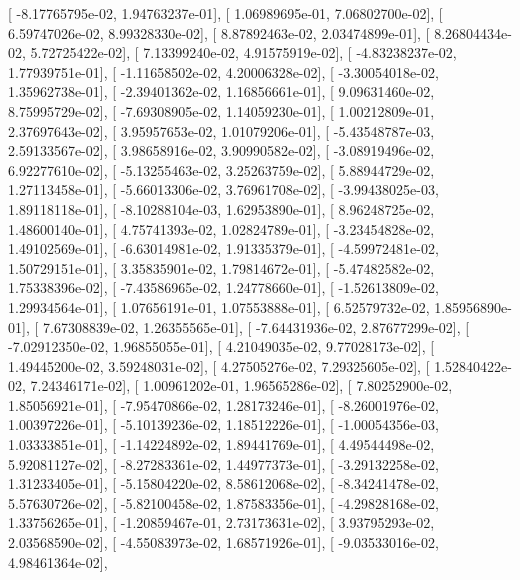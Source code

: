 \documentclass{article}
\begin{document}
       [ -8.17765795e-02,   1.94763237e-01],
       [  1.06989695e-01,   7.06802700e-02],
       [  6.59747026e-02,   8.99328330e-02],
       [  8.87892463e-02,   2.03474899e-01],
       [  8.26804434e-02,   5.72725422e-02],
       [  7.13399240e-02,   4.91575919e-02],
       [ -4.83238237e-02,   1.77939751e-01],
       [ -1.11658502e-02,   4.20006328e-02],
       [ -3.30054018e-02,   1.35962738e-01],
       [ -2.39401362e-02,   1.16856661e-01],
       [  9.09631460e-02,   8.75995729e-02],
       [ -7.69308905e-02,   1.14059230e-01],
       [  1.00212809e-01,   2.37697643e-02],
       [  3.95957653e-02,   1.01079206e-01],
       [ -5.43548787e-03,   2.59133567e-02],
       [  3.98658916e-02,   3.90990582e-02],
       [ -3.08919496e-02,   6.92277610e-02],
       [ -5.13255463e-02,   3.25263759e-02],
       [  5.88944729e-02,   1.27113458e-01],
       [ -5.66013306e-02,   3.76961708e-02],
       [ -3.99438025e-03,   1.89118118e-01],
       [ -8.10288104e-03,   1.62953890e-01],
       [  8.96248725e-02,   1.48600140e-01],
       [  4.75741393e-02,   1.02824789e-01],
       [ -3.23454828e-02,   1.49102569e-01],
       [ -6.63014981e-02,   1.91335379e-01],
       [ -4.59972481e-02,   1.50729151e-01],
       [  3.35835901e-02,   1.79814672e-01],
       [ -5.47482582e-02,   1.75338396e-02],
       [ -7.43586965e-02,   1.24778660e-01],
       [ -1.52613809e-02,   1.29934564e-01],
       [  1.07656191e-01,   1.07553888e-01],
       [  6.52579732e-02,   1.85956890e-01],
       [  7.67308839e-02,   1.26355565e-01],
       [ -7.64431936e-02,   2.87677299e-02],
       [ -7.02912350e-02,   1.96855055e-01],
       [  4.21049035e-02,   9.77028173e-02],
       [  1.49445200e-02,   3.59248031e-02],
       [  4.27505276e-02,   7.29325605e-02],
       [  1.52840422e-02,   7.24346171e-02],
       [  1.00961202e-01,   1.96565286e-02],
       [  7.80252900e-02,   1.85056921e-01],
       [ -7.95470866e-02,   1.28173246e-01],
       [ -8.26001976e-02,   1.00397226e-01],
       [ -5.10139236e-02,   1.18512226e-01],
       [ -1.00054356e-03,   1.03333851e-01],
       [ -1.14224892e-02,   1.89441769e-01],
       [  4.49544498e-02,   5.92081127e-02],
       [ -8.27283361e-02,   1.44977373e-01],
       [ -3.29132258e-02,   1.31233405e-01],
       [ -5.15804220e-02,   8.58612068e-02],
       [ -8.34241478e-02,   5.57630726e-02],
       [ -5.82100458e-02,   1.87583356e-01],
       [ -4.29828168e-02,   1.33756265e-01],
       [ -1.20859467e-01,   2.73173631e-02],
       [  3.93795293e-02,   2.03568590e-02],
       [ -4.55083973e-02,   1.68571926e-01],
       [ -9.03533016e-02,   4.98461364e-02],
\end{document}
